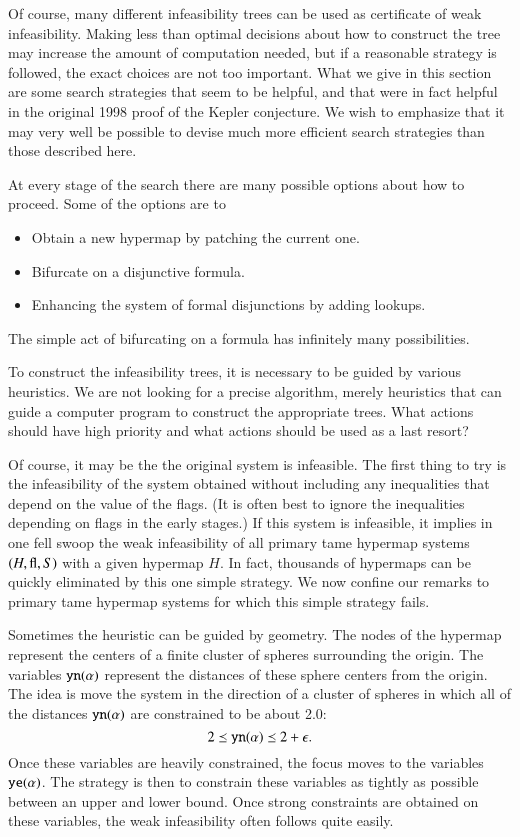 Of course, many different infeasibility trees can be used as
certificate of weak infeasibility.  Making less than optimal
decisions about how to construct the tree may increase the amount
of computation needed, but if a reasonable strategy is followed,
the exact choices are not too important.  What we give in this
section are some search strategies that seem to be helpful, and
that were in fact helpful in the original 1998 proof of the Kepler
conjecture.  We wish to emphasize that it may very well be
possible to devise much more efficient search strategies than
those described here.

At every stage of the search there are many possible options about
how to proceed.  Some of the options are to
    \begin{itemize}
    \item Obtain a new hypermap by patching the current one.
    \item Bifurcate on a disjunctive formula.
    \item Enhancing the system of formal disjunctions by adding
    lookups.
    \end{itemize}
The simple act of bifurcating on a formula has infinitely many
possibilities.

To construct the infeasibility trees, it is necessary to be guided
by various heuristics.  We are not looking for a precise
algorithm, merely heuristics that can guide a computer program to
construct the appropriate trees. What actions should have high
priority and what actions should be used as a last resort?



Of course, it may be the the original system is infeasible.  The
first thing to try is the infeasibility of the system obtained
without including any inequalities that depend on the value of the
flags.  (It is often best to ignore the inequalities depending on
flags in the early stages.)  If this system is infeasible, it
implies in one fell swoop the weak infeasibility of all primary
tame hypermap systems $(H,{\operatorname{fl}},S)$ with a given hypermap $H$.
In fact, thousands of hypermaps can be quickly eliminated by this
one simple strategy.  We now confine our remarks to primary tame
hypermap systems for which this simple strategy fails.

Sometimes the heuristic can be guided by geometry.  The nodes of
the hypermap represent the centers of a finite cluster of spheres
surrounding the origin.
 The variables ${\operatorname{{\texttt{yn}}}}(\alpha)$ represent the distances of
 these sphere centers from the origin.  The idea is move the
 system in the direction of a cluster of spheres in which all of
 the distances ${\operatorname{{\texttt{yn}}}}(\alpha)$ are constrained to be about
 2.0:
    $$2 \preceq {\operatorname{{\texttt{yn}}}}(\alpha) \preceq 2+\epsilon.$$
 Once these variables are heavily constrained, the focus moves to the
 variables ${\operatorname{{\texttt{ye}}}}(\alpha)$.  The strategy is then to constrain
 these variables as tightly as possible between an upper and lower
 bound.  Once strong constraints are obtained on these variables,
 the weak infeasibility often follows quite easily.

